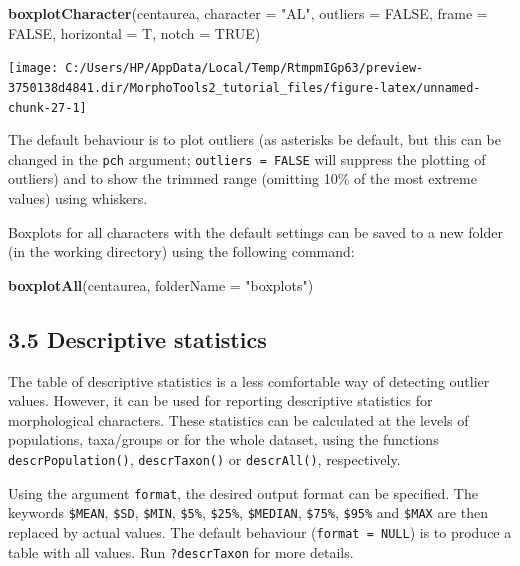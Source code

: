 \documentclass[
]{article}
\newenvironment{Shaded}{\begin{snugshade}}{\end{snugshade}}
\newcommand{\DataTypeTok}[1]{\textcolor[rgb]{0.13,0.29,0.53}{#1}}
\newcommand{\KeywordTok}[1]{\textcolor[rgb]{0.13,0.29,0.53}{\textbf{#1}}}
\newcommand{\NormalTok}[1]{#1}
\newcommand{\OtherTok}[1]{\textcolor[rgb]{0.56,0.35,0.01}{#1}}
\newcommand{\StringTok}[1]{\textcolor[rgb]{0.31,0.60,0.02}{#1}}
\begin{document}
\begin{Shaded}
\begin{Highlighting}[]
\KeywordTok{boxplotCharacter}\NormalTok{(centaurea, }\DataTypeTok{character =} \StringTok{"AL"}\NormalTok{, }\DataTypeTok{outliers =} \OtherTok{FALSE}\NormalTok{,}
                 \DataTypeTok{frame =} \OtherTok{FALSE}\NormalTok{, }\DataTypeTok{horizontal =}\NormalTok{ T, }\DataTypeTok{notch =} \OtherTok{TRUE}\NormalTok{)}
\end{Highlighting}
\end{Shaded}

\begin{center}\texttt{[image: C:/Users/HP/AppData/Local/Temp/RtmpmIGp63/preview-3750138d4841.dir/MorphoTools2\_tutorial\_files/figure-latex/unnamed-chunk-27-1]} \end{center}

The default behaviour is to plot outliers (as asterisks be default, but
this can be changed in the \texttt{pch} argument;
\texttt{outliers\ =\ FALSE} will suppress the plotting of outliers) and
to show the trimmed range (omitting 10\% of the most extreme values)
using whiskers.

Boxplots for all characters with the default settings can be saved to a
new folder (in the working directory) using the following command:

\begin{Shaded}
\begin{Highlighting}[]
\KeywordTok{boxplotAll}\NormalTok{(centaurea, }\DataTypeTok{folderName =} \StringTok{"boxplots"}\NormalTok{)}
\end{Highlighting}
\end{Shaded}

\hypertarget{descriptive-statistics}{%
\subsection{3.5 Descriptive statistics}\label{descriptive-statistics}}

The table of descriptive statistics is a less comfortable way of
detecting outlier values. However, it can be used for reporting
descriptive statistics for morphological characters. These statistics
can be calculated at the levels of populations, taxa/groups or for the
whole dataset, using the functions \texttt{descrPopulation()},
\texttt{descrTaxon()} or \texttt{descrAll()}, respectively.

Using the argument \texttt{format}, the desired output format can be
specified. The keywords \texttt{\$MEAN}, \texttt{\$SD}, \texttt{\$MIN},
\texttt{\$5\%}, \texttt{\$25\%}, \texttt{\$MEDIAN}, \texttt{\$75\%},
\texttt{\$95\%} and \texttt{\$MAX} are then replaced by actual values.
The default behaviour (\texttt{format\ =\ NULL}) is to produce a table
with all values. Run \texttt{?descrTaxon} for more details.
\end{document}
